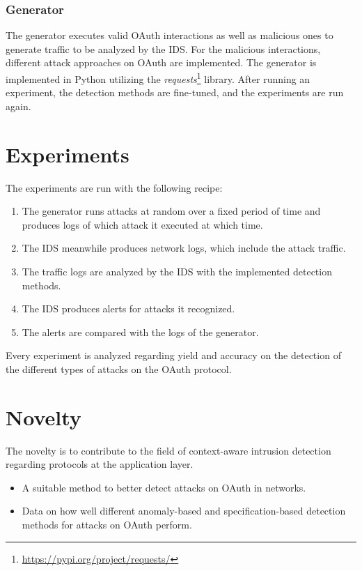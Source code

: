 \documentclass{article}
\begin{document}
\subsubsection{Generator}
The generator executes valid OAuth interactions as well as malicious ones to generate traffic to be analyzed by the IDS. For the malicious interactions, different attack approaches on OAuth are implemented. The generator is implemented in Python utilizing the \emph{requests}\footnote{\url{https://pypi.org/project/requests/}} library. After running an experiment, the detection methods are fine-tuned, and the experiments are run again.

\section{Experiments}
The experiments are run with the following recipe:
\begin{enumerate}
    \item The generator runs attacks at random over a fixed period of time and produces logs of which attack it executed at which time.
    \item The IDS meanwhile produces network logs, which include the attack traffic.
    \item The traffic logs are analyzed by the IDS with the implemented detection methods.
    \item The IDS produces alerts for attacks it recognized.
    \item The alerts are compared with the logs of the generator.
\end{enumerate}
Every experiment is analyzed regarding yield and accuracy on the detection of the different types of attacks on the OAuth protocol.

\section{Novelty}
The novelty is to contribute to the field of context-aware intrusion detection regarding protocols at the application layer.
\begin{itemize}
    \item A suitable method to better detect attacks on OAuth in networks.
    \item Data on how well different anomaly-based and specification-based detection methods for attacks on OAuth perform.
\end{itemize}




\end{document}
